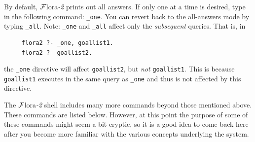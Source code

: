 \documentclass[11pt]{article}
\newcommand{\FLORA}{{\mbox{\sc ${\cal F}${lora}\rm\emph{-2}}}\xspace}
\begin{document}
By default, \FLORA prints out all answers. If only one at a time is
desired, type in the following command: {\tt \_one}. You can revert back to
the all-answers mode by typing {\tt \_all}. Note: {\tt \_one} and {\tt \_all}
affect only the \emph{subsequent} queries. That is, in
\begin{verbatim}
     flora2 ?- _one, goallist1.
     flora2 ?- goallist2.
\end{verbatim}
the {\tt \_one} directive will affect {\tt goallist2},
but \emph{not} {\tt goallist1}. This is because {\tt goallist1} executes in
the same query as {\tt \_one} and thus is not affected by this directive.

The \FLORA shell includes many more commands beyond those mentioned above.
These commands are listed below. However, at this point the purpose of some
of these commands might seem a bit cryptic, so it is a good idea to come
back here after you become more familiar with the various concepts
underlying the system.
\end{document}
